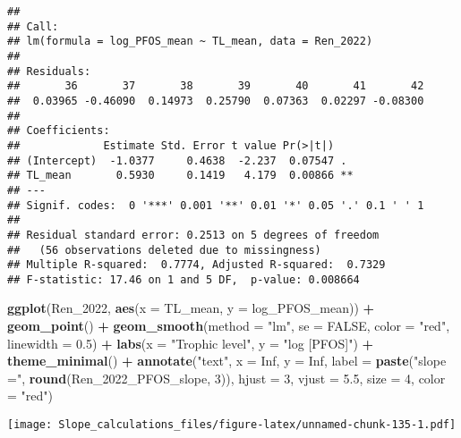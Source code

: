 \documentclass[
]{article}
\newenvironment{Shaded}{\begin{snugshade}}{\end{snugshade}}
\newcommand{\AttributeTok}[1]{\textcolor[rgb]{0.13,0.29,0.53}{#1}}
\newcommand{\ConstantTok}[1]{\textcolor[rgb]{0.56,0.35,0.01}{#1}}
\newcommand{\DecValTok}[1]{\textcolor[rgb]{0.00,0.00,0.81}{#1}}
\newcommand{\FloatTok}[1]{\textcolor[rgb]{0.00,0.00,0.81}{#1}}
\newcommand{\FunctionTok}[1]{\textcolor[rgb]{0.13,0.29,0.53}{\textbf{#1}}}
\newcommand{\NormalTok}[1]{#1}
\newcommand{\SpecialCharTok}[1]{\textcolor[rgb]{0.81,0.36,0.00}{\textbf{#1}}}
\newcommand{\StringTok}[1]{\textcolor[rgb]{0.31,0.60,0.02}{#1}}
\begin{document}
\begin{verbatim}
## 
## Call:
## lm(formula = log_PFOS_mean ~ TL_mean, data = Ren_2022)
## 
## Residuals:
##       36       37       38       39       40       41       42 
##  0.03965 -0.46090  0.14973  0.25790  0.07363  0.02297 -0.08300 
## 
## Coefficients:
##             Estimate Std. Error t value Pr(>|t|)   
## (Intercept)  -1.0377     0.4638  -2.237  0.07547 . 
## TL_mean       0.5930     0.1419   4.179  0.00866 **
## ---
## Signif. codes:  0 '***' 0.001 '**' 0.01 '*' 0.05 '.' 0.1 ' ' 1
## 
## Residual standard error: 0.2513 on 5 degrees of freedom
##   (56 observations deleted due to missingness)
## Multiple R-squared:  0.7774, Adjusted R-squared:  0.7329 
## F-statistic: 17.46 on 1 and 5 DF,  p-value: 0.008664
\end{verbatim}

\begin{Shaded}
\begin{Highlighting}[]
\FunctionTok{ggplot}\NormalTok{(Ren\_2022, }\FunctionTok{aes}\NormalTok{(}\AttributeTok{x =}\NormalTok{ TL\_mean, }\AttributeTok{y =}\NormalTok{ log\_PFOS\_mean)) }\SpecialCharTok{+}
  \FunctionTok{geom\_point}\NormalTok{() }\SpecialCharTok{+}
  \FunctionTok{geom\_smooth}\NormalTok{(}\AttributeTok{method =} \StringTok{"lm"}\NormalTok{, }\AttributeTok{se =} \ConstantTok{FALSE}\NormalTok{, }\AttributeTok{color =} \StringTok{"red"}\NormalTok{, }\AttributeTok{linewidth =} \FloatTok{0.5}\NormalTok{) }\SpecialCharTok{+}
  \FunctionTok{labs}\NormalTok{(}\AttributeTok{x =} \StringTok{"Trophic level"}\NormalTok{,}
       \AttributeTok{y =} \StringTok{"log [PFOS]"}\NormalTok{) }\SpecialCharTok{+}
  \FunctionTok{theme\_minimal}\NormalTok{() }\SpecialCharTok{+}
  \FunctionTok{annotate}\NormalTok{(}\StringTok{"text"}\NormalTok{, }\AttributeTok{x =} \ConstantTok{Inf}\NormalTok{, }\AttributeTok{y =} \ConstantTok{Inf}\NormalTok{, }\AttributeTok{label =} \FunctionTok{paste}\NormalTok{(}\StringTok{"slope ="}\NormalTok{, }\FunctionTok{round}\NormalTok{(Ren\_2022\_PFOS\_slope, }\DecValTok{3}\NormalTok{)), }
           \AttributeTok{hjust =} \DecValTok{3}\NormalTok{, }\AttributeTok{vjust =} \FloatTok{5.5}\NormalTok{, }\AttributeTok{size =} \DecValTok{4}\NormalTok{, }\AttributeTok{color =} \StringTok{"red"}\NormalTok{)}
\end{Highlighting}
\end{Shaded}

\texttt{[image: Slope\_calculations\_files/figure-latex/unnamed-chunk-135-1.pdf]}
\end{document}
